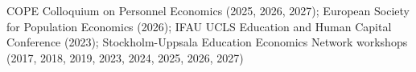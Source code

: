 COPE Colloquium on Personnel Economics (2025, 2026, 2027); European Society for Population Economics (2026); IFAU UCLS Education and Human Capital Conference (2023); Stockholm-Uppsala Education Economics Network workshops (2017, 2018, 2019, 2023, 2024, 2025, 2026, 2027)%
